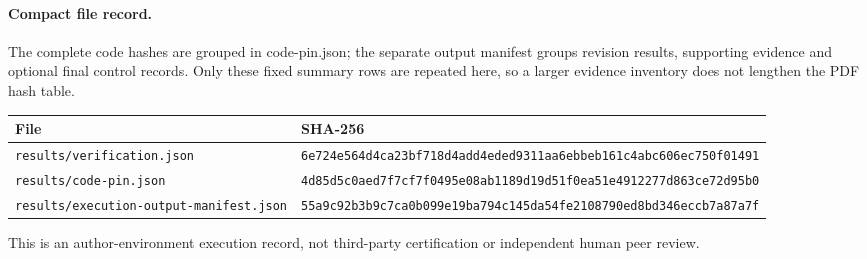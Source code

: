 \paragraph{Compact file record.}
The complete code hashes are grouped in code-pin.json; the separate output manifest groups revision results, supporting evidence and optional final control records. Only these fixed summary rows are repeated here, so a larger evidence inventory does not lengthen the PDF hash table.
\begin{center}
\scriptsize
\begin{tabular}{@{}p{.38\linewidth}p{.59\linewidth}@{}}
\toprule
File & SHA-256 \\
\midrule
\nolinkurl{results/verification.json} & \texttt{6e724e564d4ca23bf718d4add4eded9311aa6ebbeb161c4abc606ec750f01491} \\
\nolinkurl{results/code-pin.json} & \texttt{4d85d5c0aed7f7cf7f0495e08ab1189d19d51f0ea51e4912277d863ce72d95b0} \\
\nolinkurl{results/execution-output-manifest.json} & \texttt{55a9c92b3b9c7ca0b099e19ba794c145da54fe2108790ed8bd346eccb7a87a7f} \\
\bottomrule
\end{tabular}
\end{center}
This is an author-environment execution record, not third-party certification or independent human peer review.
